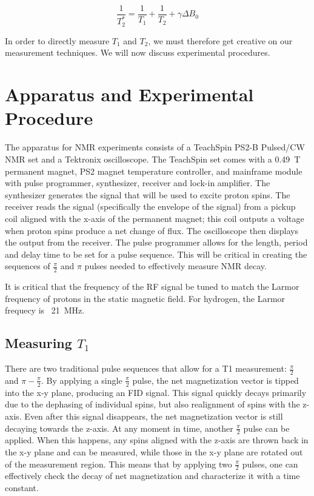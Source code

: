 \documentclass[
    floatfix,  %
    reprint,
    amsmath,amssymb,
    aps,
]{revtex4-2}
\newcommand{\halfpi}{\frac{\pi}{2}}
\begin{document}
\begin{equation}
    \frac{1}{T_2^*} = \frac{1}{T_1}+\frac{1}{T_2}+ \gamma \Delta B_0
\end{equation}

In order to directly measure $T_1$ and $T_2$, we must therefore get creative on our measurement techniques. We will now discuss experimental procedures.

\section{Apparatus and Experimental Procedure}

The apparatus for NMR experiments consists of a TeachSpin PS2-B Pulsed/CW NMR set and a Tektronix oscilloscope. The TeachSpin set comes with a \SI{0.49}{\tesla} permanent magnet, PS2 magnet temperature controller, and mainframe module with pulse programmer, synthesizer, receiver and lock-in amplifier. The synthesizer generates the signal that will be used to excite proton spins. The receiver reads the signal (specifically the envelope of the signal) from a pickup coil aligned with the x-axis of the permanent magnet; this coil outputs a voltage when proton spins produce a net change of flux. The oscilloscope then displays the output from the receiver. The pulse programmer allows for the length, period and delay time to be set for a pulse sequence. This will be critical in creating the sequences of $\halfpi$ and $\pi$ pulses needed to effectively measure NMR decay.

It is critical that the frequency of the RF signal be tuned to match the Larmor frequency of protons in the static magnetic field. For hydrogen, the Larmor frequecy is ~\SI{21}{\mega\hertz}.

\subsection{Measuring $T_1$ \label{sec:measure-t1}}

There are two traditional pulse sequences that allow for a T1 measurement: $\halfpi$ and $\pi-\halfpi$. By applying a single $\halfpi$ pulse, the net magnetization vector is tipped into the x-y plane, producing an FID signal. This signal quickly decays primarily due to the dephasing of individual spins, but also realignment of spins with the z-axis. Even after this signal disappears, the net magnetization vector is still decaying towards the z-axis. At any moment in time, another $\halfpi$ pulse can be applied. When this happens, any spins aligned with the z-axis are thrown back in the x-y plane and can be measured, while those in the x-y plane are rotated out of the measurement region. This means that by applying two $\halfpi$ pulses, one can effectively check the decay of net magnetization and characterize it with a time constant.
\end{document}
